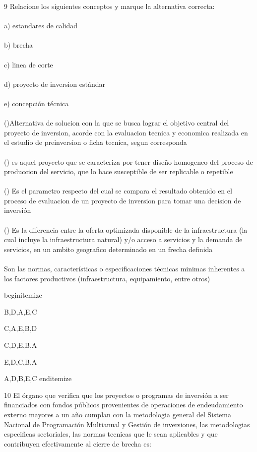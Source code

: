 9 Relacione los siguientes conceptos y marque la alternativa correcta:\\
\\
a) estandares de calidad\\
\\
b) brecha\\
\\
c) linea de corte \\
\\
d) proyecto de inversion estándar \\
\\
e) concepción técnica\\
\\
()Alternativa de solucion con la que se busca lograr el objetivo central del proyecto de inversion, acorde con la evaluacion tecnica y economica realizada en el estudio de preinversion o ficha tecnica, segun corresponda\\
\\
() es aquel proyecto que se caracteriza por tener diseño homogeneo del proceso de produccion del servicio, que lo hace susceptible de ser replicable o repetible\\
\\
() Es el parametro respecto del cual se compara el resultado obtenido en el proceso de evaluacion de un proyecto de inversion para tomar una decision de inversión\\
\\
() Es la diferencia entre la oferta optimizada disponible de la infraestructura (la cual incluye la infraestructura natural) y/o acceso a servicios y la demanda de servicios, en un ambito geografico determinado en un frecha definida\\
\\
Son las normas, características o especificaciones técnicas minimas inherentes a los factores productivos (infraestructura, equipamiento, entre otros)

begin{itemize}
			\item B,D,A,E,C
 			\item C,A,E,B,D
			\item C,D,E,B,A
			\item E,D,C,B,A
			\item A,D,B,E,C
end{itemize}

10 El órgano que verifica que los proyectos o programas de inversión a ser financiados con fondos públicos provenientes de operaciones de endeudamiento externo mayores a un año cumplan con la metodologia general del Sistema Nacional de Programación Multianual y Gestión de inversiones, las metodologias especificas sectoriales, las normas tecnicas que le sean aplicables y que contribuyen efectivamente al cierre de brecha es:

